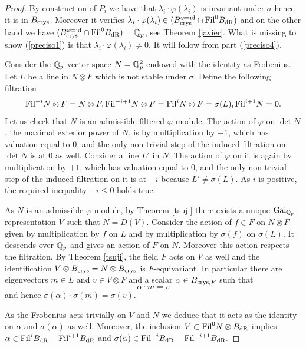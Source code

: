 \begin{proof}
By construction of $P_i$ we have that $\lambda_i \cdot\varphi(\lambda_i) $ is invariant under $\sigma$ hence it is in $B_{\textnormal{crys}}$. Moreover it verifies  $ \lambda_i \cdot\varphi(\lambda_i) \in (B_{\textnormal{crys}}^{\varphi=\mathrm{id}} \cap \textnormal{Fil}^0B_{\mathrm{dR}})$  and on the other hand we have  $(B_{\textnormal{crys}}^{\varphi=\mathrm{id}} \cap \textnormal{Fil}^0B_{\mathrm{dR}})=\mathbb{Q}_p$, see Theorem \ref{javier}. What is missing to show (\ref{preciso1}) is that $\lambda_i \cdot\varphi(\lambda_i)\neq 0.$ It will follow from part (\ref{preciso4}).

 Consider the $\mathbb{Q}_p$-vector space $N=\mathbb{Q}_p^2$ endowed with the identity as Frobenius. Let $L$ be a line in $N\otimes F$ which is not stable under $\sigma$.
Define the following filtration
\[\textnormal{Fil}^{-i}N\otimes F=N\otimes F, \textnormal{Fil}^{-i+1}N\otimes F =\textnormal{Fil}^i N \otimes F=\sigma(L), \textnormal{Fil}^{i+1} N=0.  \]
Let us  check that $N$ is an admissible filtered $\varphi$-module.  The action of $\varphi$ on $\det N$, the maximal exterior power of $N$, is by multiplication by $+1$, which has valuation equal to $0$, and the only non trivial step of the induced filtration on $\det N$ is at $0$ as well. Consider a line $L'$ in $N$. The action of $\varphi$ on it is again by multiplication by $+ 1$, which has valuation equal to $0$, and the only non trivial step of the induced filtration on it is at $-i$ because $L'\neq \sigma(L)$. As $i$ is  positive, the required inequality  $-i \leq 0$ holds true.

 As $N$ is an admissible $\varphi$-module, by Theorem \ref{tsuji} there exists a unique $\textnormal{Gal}_{\mathbb{Q}_p}$-representation $V$ such that $N=D(V)$. Consider the action of $f\in F$ on $N\otimes F$ given by multiplication by $f$ on $L$ and by multiplication by $\sigma(f)$ on $ \sigma(L)$. It descends over $\mathbb{Q}_p$ and gives an action of $F$ on $N$. Moreover this action respects the filtration. By  Theorem \ref{tsuji}, the field $F$ acts on $V$ as well and  the identification $V \otimes B_{\textnormal{crys}}= N \otimes B_{\textnormal{crys}}$ is $F$-equivariant. In particular there are eigenvectors
 $m\in L$ and  $v \in V \otimes F$ and a scalar $\alpha \in B_{\textnormal{crys},F}$ such that
  \[
\alpha \cdot m=   v
 \]
 and hence $ \sigma(\alpha) \cdot \sigma(m)=   \sigma(v)$.

As the Frobenius acts trivially on $V$ and $N$ we deduce that it acts as the identity on  $\alpha$ and $\sigma(\alpha)$ as well.
Moreover,  the inclusion $V \subset \textnormal{Fil}^0 N\otimes B_{\mathrm{dR}}$ implies $\alpha \in \textnormal{Fil} ^i B_{\mathrm{dR}}-\textnormal{Fil} ^{i+1} B_{\mathrm{dR}}$ and $\sigma(\alpha) \in \textnormal{Fil} ^{-i} B_{\mathrm{dR}}-\textnormal{Fil} ^{-i+1} B_{\mathrm{dR}}.$


\end{proof}
